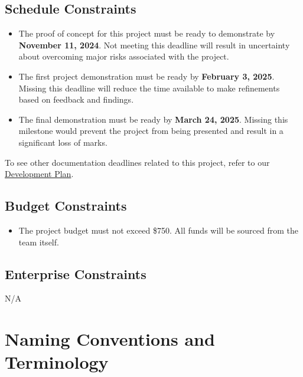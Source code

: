 \documentclass[12pt]{article}
\begin{document}
\subsection{Schedule Constraints}
\begin{itemize}
  \item The proof of concept for this project must be ready to demonstrate by \textbf{November 11, 2024}. Not meeting this deadline will result in uncertainty about overcoming major risks associated with the project.
  \item The first project demonstration must be ready by \textbf{February 3, 2025}. Missing this deadline will reduce the time available to make refinements based on feedback and findings.
  \item The final demonstration must be ready by \textbf{March 24, 2025}. Missing this milestone would prevent the project from being presented and result in a significant loss of marks.
\end{itemize}
To see other documentation deadlines related to this project, refer to our \href{https://github.com/OKKM-insights/OKKM.insights/blob/main/docs/DevelopmentPlan/DevelopmentPlan.pdf}{Development Plan}. 
\subsection{Budget Constraints}
\begin{itemize}
  \item The project budget must not exceed \$750. All funds will be sourced from the team itself.
\end{itemize}
\subsection{Enterprise Constraints}
N/A
\newpage
\section{Naming Conventions and Terminology}
\end{document}
